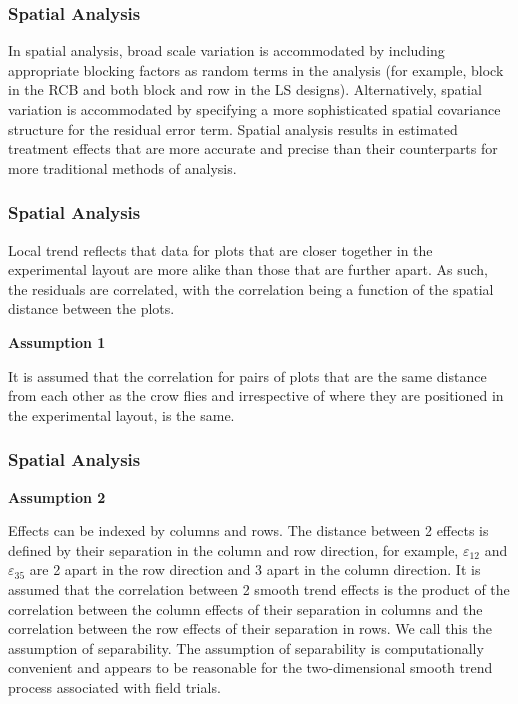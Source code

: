 \begin{frame}\frametitle{Spatial Analysis}
In spatial analysis, broad scale variation is accommodated by including appropriate blocking factors as
random terms in the analysis (for example, block in the RCB and both block and row in the LS designs). Alternatively,
spatial variation is accommodated by specifying a more sophisticated spatial covariance structure for the residual
error term. Spatial analysis results in estimated treatment effects that are more accurate and precise than their
counterparts for more traditional methods of analysis.
\end{frame}



\begin{frame}\frametitle{Spatial Analysis}
Local trend reflects that data for plots that are closer together in the experimental layout are more alike than those
that are further apart. As such, the residuals are correlated, with the correlation being a function of the spatial
distance between the plots.

\textbf{Assumption 1}

It is assumed that the correlation for pairs of plots that are the same distance from each other as the crow flies and
irrespective of where they are positioned in the experimental layout, is the same.

\end{frame}


\begin{frame}\frametitle{Spatial Analysis}

\textbf{Assumption 2}

Effects can be indexed by columns and rows. The distance between 2 effects is defined by their separation in the column
and row direction, for example, $\varepsilon_{12}$ and $\varepsilon_{35}$ are 2 apart in the row direction and 3 apart
in the column direction. It is assumed that the correlation between 2 smooth trend effects is the product of the
correlation between the column effects of their separation in columns and the correlation between the row effects of
their separation in rows. We call this the assumption of separability. The assumption of separability is
computationally convenient and appears to be reasonable for the two-dimensional smooth trend process associated with
field trials.

\end{frame}



